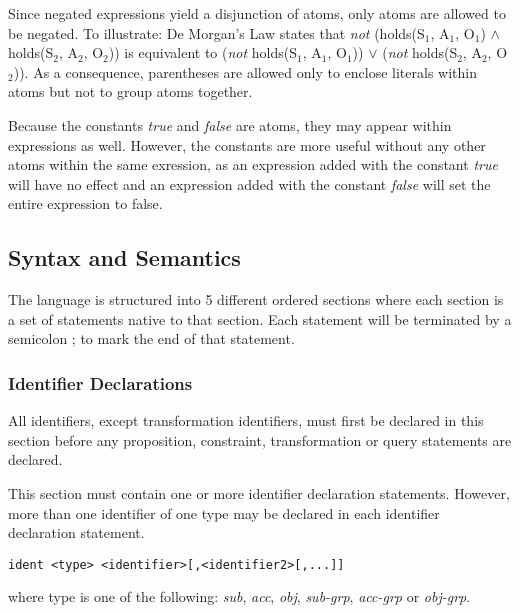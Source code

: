 \documentclass[a4paper]{article}
\begin{document}
        Since negated expressions yield a disjunction of atoms, only
        atoms are allowed to be negated. To illustrate: De Morgan's Law
        states that \emph{not} (holds(S$_{1}$, A$_{1}$, O$_{1}$) $\land$
        holds(S$_{2}$, A$_{2}$, O$_{2}$)) is equivalent to (\emph{not} 
        holds(S$_{1}$, A$_{1}$, O$_{1}$)) $\lor$ (\emph{not} holds(S$_{2}$, 
        A$_{2}$, O$_{2}$)). As a consequence, parentheses are allowed only
        to enclose literals within atoms but not to group atoms together. 

        Because the constants \emph{true} and \emph{false} are atoms, they may 
        appear within expressions as well. However, the constants are more
        useful without any other atoms within the same exression, as an
        expression added with the constant \emph{true} will have no effect
        and an expression added with the constant \emph{false} will set the
        entire expression to false.

    \subsection{Syntax and Semantics}

      The language is structured into 5 different ordered sections where each
      section is a set of statements native to that section.  Each statement
      will be terminated by a semicolon ; to mark the end of that statement.

      \subsubsection{Identifier Declarations}

        All identifiers, except transformation identifiers, must first be 
        declared in this section before any proposition, constraint, 
        transformation or query statements are declared.

        This section must contain one or more identifier declaration
        statements. However, more than one identifier of one type may be 
        declared in each identifier declaration statement.

\begin{verbatim}
ident <type> <identifier>[,<identifier2>[,...]]
\end{verbatim}

        where type is one of the following: \emph{sub}, \emph{acc}, \emph{obj},
        \emph{sub-grp}, \emph{acc-grp} or \emph{obj-grp}.
\end{document}

